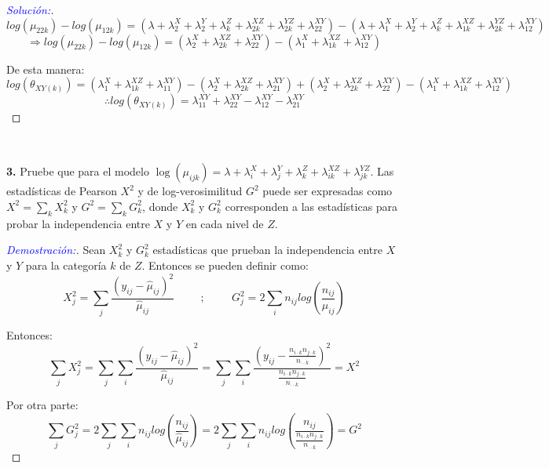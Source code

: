 \documentclass[12pt,a4paper,oneside]{article}
\begin{document}
\begin{compactenum}
\begin{proof}[\textcolor{blue}{Solución:}]
$$log(\mu_{22k}) -  log(\mu_{12k}) = (\lambda + \lambda_2^X + \lambda_2^Y + \lambda_k^Z + \lambda_{2k}^{XZ} + \lambda_{2k}^{YZ} + \lambda_{22}^{XY}) - (\lambda + \lambda_1^X + \lambda_2^Y + \lambda_k^Z + \lambda_{1k}^{XZ} + \lambda_{2k}^{YZ} + \lambda_{12}^{XY})$$
$$\Rightarrow log(\mu_{22k}) -  log(\mu_{12k}) = (\lambda_2^X + \lambda_{2k}^{XZ} + \lambda_{22}^{XY}) - (\lambda_1^X + \lambda_{1k}^{XZ} + \lambda_{12}^{XY})$$

	De esta manera:
$$log(\theta_{XY(k)}) = (\lambda_1^X + \lambda_{1k}^{XZ} + \lambda_{11}^{XY}) - (\lambda_2^X + \lambda_{2k}^{XZ} + \lambda_{21}^{XY}) + (\lambda_2^X + \lambda_{2k}^{XZ} + \lambda_{22}^{XY}) - (\lambda_1^X + \lambda_{1k}^{XZ} + \lambda_{12}^{XY})$$
$$\therefore log(\theta_{XY(k)}) = \lambda_{11}^{XY} + \lambda_{22}^{XY} - \lambda_{12}^{XY} - \lambda_{21}^{XY}$$
	
	\end{proof}
\end{compactenum}

\

\noindent \textbf{3. } Pruebe que para el modelo
 $\log(\mu_{ijk}) = \lambda + \lambda_i^X + \lambda_j^Y + \lambda_k^Z + \lambda_{ik}^{XZ} + \lambda_{jk}^{YZ}.$ Las estadísticas de Pearson $X^2$ y de log-verosimilitud $G^2$ puede ser expresadas como $X^2=\sum_k X_k^2$ y $G^2 =\sum_k G_k^2$, donde $X_k^2$ y $G_k^2$ corresponden a las estadísticas para probar la independencia entre $X$ y $Y$ en cada nivel de $Z$.\\
\begin{proof}[\textcolor{blue}{Demostración:}] Sean $X_k^2$ y $G_k^2$ estadísticas que prueban la independencia entre $X$ y $Y$ para la categoría $k$ de $Z$. Entonces se pueden definir como:
$$X_j^2 = \sum_j \frac{(y_{ij} - \widehat{\mu}_{ij})^2}{\widehat{\mu}_{ij}} \hspace{1cm} ; \hspace{1cm} G_j^2 = 2 \sum_i n_{ij} log(\frac{n_{ij}}{\widehat{\mu}_{ij}})$$
 
 Entonces:
 $$\sum_j X_j^2 = \sum_j \sum_i \frac{(y_{ij} - \widehat{\mu}_{ij})^2}{\widehat{\mu}_{ij}} = \sum_j \sum_i \frac{(y_{ij} - \frac{n_{i \cdot k} n_{j \cdot k}}{n_{\cdot \cdot k}})^2}{\frac{n_{i \cdot k} n_{j \cdot k}}{n_{\cdot \cdot k}}} = X^2$$
 
 Por otra parte:
 $$\sum_{j} G_j^2 = 2 \sum_{j} \sum_i n_{ij} log(\frac{n_{ij}}{\widehat{\mu}_{ij}}) = 2 \sum_{j} \sum_i n_{ij} log(\frac{n_{ij}}{\frac{n_{i \cdot k} n_{j \cdot k}}{n_{\cdot \cdot k}}}) = G^2$$
 
\end{proof}
  
\end{document}
